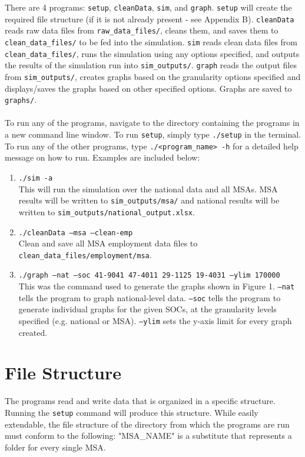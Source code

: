 \documentclass[10pt]{article}
\begin{document}
There are 4 programs: \texttt{setup}, \texttt{cleanData}, \texttt{sim}, and \texttt{graph}. \texttt{setup} will create the required file structure (if it is not already present - see Appendix B). \texttt{cleanData} reads raw data files from \texttt{raw\_data\_files/}, cleans them, and saves them to \texttt{clean\_data\_files/} to be fed into the simulation. \texttt{sim} reads clean data files from \texttt{clean\_data\_files/}, runs the simulation using any options specified, and outputs the results of the simulation run into \texttt{sim\_outputs/}. \texttt{graph} reads the output files from \texttt{sim\_outputs/}, creates graphs based on the granularity options specified and displays/saves the graphs based on other specified options. Graphs are saved to \texttt{graphs/}.\\\\ To run any of the programs, navigate to the directory containing the programs in a new command line window. To run \texttt{setup}, simply type \texttt{./setup} in the terminal. To run any of the other programs, type \texttt{./<program\_name> -h} for a detailed help message on how to run. Examples are included below:
\begin{enumerate}
    \item \texttt{./sim -a} \\ This will run the simulation over the national data and all MSAs. MSA results will be written to \texttt{sim\_outputs/msa/} and national results will be written to \texttt{sim\_outputs/national\_output.xlsx}.
    \item \texttt{./cleanData --msa --clean-emp} \\ Clean and save all MSA employment data files to \texttt{clean\_data\_files/employment/msa}.
    \item \texttt{./graph --nat --soc 41-9041 47-4011 29-1125 19-4031 --ylim 170000} \\ This was the command used to generate the graphs shown in Figure 1. \texttt{--nat} tells the program to graph national-level data. \texttt{--soc} tells the program to generate individual graphs for the given SOCs, at the granularity levels specified (e.g. national or MSA). \texttt{--ylim} sets the y-axis limit for every graph created.
\end{enumerate}

\section{File Structure}
The programs read and write data that is organized in a specific structure. Running the \texttt{setup} command will produce this structure. While easily extendable, the file structure of the directory from which the programs are run must conform to the following:
\smallskip
"MSA\_NAME" is a substitute that represents a folder for every single MSA.
\end{document}
